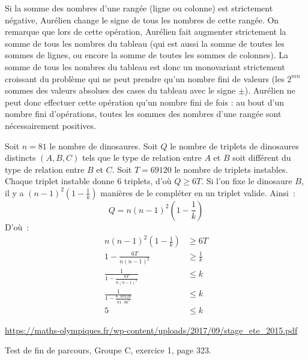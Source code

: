 \begin{sol}
Si la somme des nombres d'une rangée (ligne ou colonne) est strictement négative, Aurélien change le signe de tous les nombres de cette rangée. On remarque que lors de cette opération, Aurélien fait augmenter strictement la somme de tous les nombres du tableau (qui est aussi la somme de toutes les sommes de lignes, ou encore la somme de toutes les sommes de colonnes). La somme de tous les nombres du tableau est donc un monovariant strictement croissant du problème qui ne peut prendre qu'un nombre fini de valeurs (les $2^{mn}$ sommes des valeurs absolues des cases du tableau avec le signe $\pm$). Aurélien ne peut donc effectuer cette opération qu'un nombre fini de fois : au bout d'un nombre fini d'opérations, toutes les sommes des nombres d'une rangée sont nécessairement positives.
\end{sol}

\begin{sol}
Soit $n = 81$ le nombre de dinosaures.
Soit $Q$ le nombre de triplets de dinosaures distincts $(A, B, C)$ tels que le type de relation entre $A$ et $B$ soit différent du type de relation entre $B$ et $C$.
Soit $T = 69120$ le nombre de triplets instables. Chaque triplet instable donne $6$ triplets, d'où $Q \ge 6T$.
Si l'on fixe le dinosaure $B$, il y a $(n - 1)^2 \left (1 - \frac{1}{k}\right )$ manières de le compléter en un triplet valide.
Ainsi~:
$$Q = n(n - 1)^2 \left (1 - \frac{1}{k}\right )$$
D'où~:
\begin{align*}
    n(n - 1)^2 \left (1 - \frac{1}{k}\right ) &\ge 6T \\
    1 - \frac{6T}{n(n - 1)^2} &\ge \frac{1}{k} \\
    \frac{1}{1 - \frac{6T}{n(n - 1)^2}} &\le k \\
    \frac{1}{1 - \frac{6\cdot 69120}{81\cdot80^2}} &\le k \\
    5 &\le k
\end{align*}
\end{sol}


\begin{sol}
\url{https://maths-olympiques.fr/wp-content/uploads/2017/09/stage_ete_2015.pdf}

Test de fin de parcours, Groupe C, exercice 1, page 323.
\end{sol}